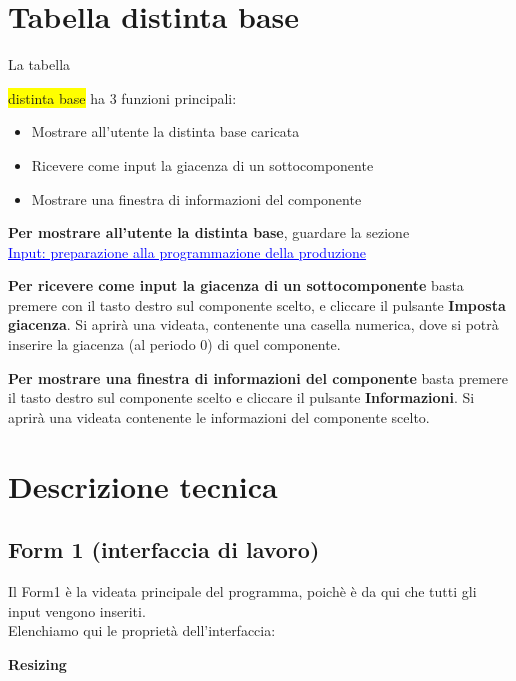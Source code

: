 \documentclass[12pt,twoside]{report}
\begin{document}
\section{Tabella distinta base}

\hypertarget{tabDistintaBase}{La tabella} \colorbox{yellow}{distinta base} ha 3 funzioni principali:

\begin{itemize}
	
	\item Mostrare all'utente la distinta base caricata
	\item Ricevere come input la giacenza di un sottocomponente
	\item Mostrare una finestra di informazioni del componente\\
	      	
\end{itemize}

\textbf{Per mostrare all'utente la distinta base}, guardare la sezione\\ \hyperlink{inputProduzione}{\textcolor{blue}{\underline{Input: preparazione alla programmazione della produzione}}}

\bigskip
\textbf{Per ricevere come input la giacenza di un sottocomponente} basta premere con il tasto destro sul componente scelto, e cliccare il pulsante \textbf{Imposta giacenza}. Si aprirà una videata, contenente una casella numerica, dove si potrà inserire la giacenza (al periodo 0) di quel componente.

\bigskip
\textbf{Per mostrare una finestra di informazioni del componente} basta premere il tasto destro sul componente scelto e cliccare il pulsante \textbf{Informazioni}. Si aprirà una videata contenente le informazioni del componente scelto.


\section{Descrizione tecnica}

\subsection{Form 1 (interfaccia di lavoro)}

Il Form1 è la videata principale del programma, poichè è da qui che tutti gli input vengono inseriti.\\
Elenchiamo qui le proprietà dell'interfaccia:

\bigskip
\textbf{Resizing}
\end{document}
